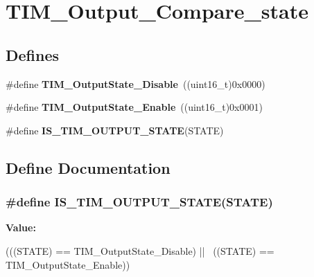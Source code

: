 \hypertarget{group__TIM__Output__Compare__state}{
\section{TIM\_\-Output\_\-Compare\_\-state}
\label{group__TIM__Output__Compare__state}
}
\subsection*{Defines}
\begin{DoxyCompactItemize}
\item 
\hypertarget{group__TIM__Output__Compare__state_ga4ad0f484cfa16b5190654da8278940d0}{
\#define {\bfseries TIM\_\-OutputState\_\-Disable}~((uint16\_\-t)0x0000)}
\label{group__TIM__Output__Compare__state_ga4ad0f484cfa16b5190654da8278940d0}

\item 
\hypertarget{group__TIM__Output__Compare__state_ga65afdda8761b6ac5ed0c0ad67c05dffe}{
\#define {\bfseries TIM\_\-OutputState\_\-Enable}~((uint16\_\-t)0x0001)}
\label{group__TIM__Output__Compare__state_ga65afdda8761b6ac5ed0c0ad67c05dffe}

\item 
\#define {\bfseries IS\_\-TIM\_\-OUTPUT\_\-STATE}(STATE)
\end{DoxyCompactItemize}


\subsection{Define Documentation}
\hypertarget{group__TIM__Output__Compare__state_ga5848617f830d2de688eaff50ed279679}{
\subsubsection[{IS\_\-TIM\_\-OUTPUT\_\-STATE}]{\setlength{\rightskip}{0pt plus 5cm}\#define IS\_\-TIM\_\-OUTPUT\_\-STATE(STATE)}}
\label{group__TIM__Output__Compare__state_ga5848617f830d2de688eaff50ed279679}
{\bfseries Value:}
\begin{DoxyCode}
(((STATE) == TIM_OutputState_Disable) || \
                                    ((STATE) == TIM_OutputState_Enable))
\end{DoxyCode}
